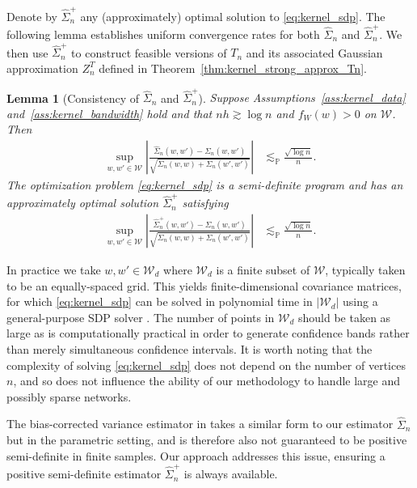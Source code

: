 \documentclass[11pt,lof]{puthesis}
\renewcommand{\P}{\ensuremath{\mathbb{P}}}
\newcommand{\cW}{\ensuremath{\mathcal{W}}}
\theoremstyle{break}
\newtheorem{lemma}{Lemma}[section]
\theoremstyle{proof}
\begin{document}
Denote by $\hat\Sigma_n^+$ any (approximately) optimal solution to
\eqref{eq:kernel_sdp}. The following lemma establishes uniform convergence rates
for both $\hat \Sigma_n$ and $\hat \Sigma_n^+$.
We then use $\hat \Sigma_n^+$ to construct feasible versions of $T_n$ and its
associated Gaussian approximation $Z_n^{T}$ defined in
Theorem~\ref{thm:kernel_strong_approx_Tn}.
%
\begin{lemma}[Consistency of $\hat \Sigma_n$ and $\hat \Sigma_n^+$]
  \label{lem:kernel_sdp}
  Suppose Assumptions~\ref{ass:kernel_data} and~\ref{ass:kernel_bandwidth} hold
  and that $n h \gtrsim \log n$ and $f_W(w) > 0$ on $\cW$. Then
  \begin{align*}
    \sup_{w,w' \in \cW}
    \left| \frac{\hat \Sigma_n(w,w') - \Sigma_n(w,w')}
    {\sqrt{\Sigma_n(w,w) + \Sigma_n(w',w')}} \right|
    &\lesssim_\P \frac{\sqrt{\log n}}{n}.
  \end{align*}
  The optimization problem \eqref{eq:kernel_sdp} is a semi-definite
  program
  \citep[SDP,][]{laurent2005semidefinite} and has an approximately optimal
  solution $\hat\Sigma_n^+$ satisfying
  \begin{align*}
    \sup_{w,w' \in \cW} \left|
    \frac{\hat \Sigma_n^+(w,w') - \Sigma_n(w,w')}
    {\sqrt{\Sigma_n(w,w) + \Sigma_n(w',w')}} \right|
    &\lesssim_\P \frac{\sqrt{\log n}}{n}.
  \end{align*}
\end{lemma}

In practice we take $w, w' \in \cW_d$ where $\cW_d$ is a finite subset of
$\cW$, typically taken to be an equally-spaced grid. This yields
finite-dimensional covariance matrices, for which \eqref{eq:kernel_sdp} can be
solved
in polynomial time in $|\cW_d|$ using a general-purpose SDP solver
\citep[e.g.\ by interior point methods,][]{laurent2005semidefinite}.
The number of points in $\cW_d$ should be taken as large as is computationally
practical in order to generate confidence bands rather than merely simultaneous
confidence intervals. It is worth noting that the complexity of solving
\eqref{eq:kernel_sdp} does not depend on the number of vertices $n$, and so
does not
influence the ability of our methodology to handle large and possibly sparse
networks.

The bias-corrected variance estimator in
\citet[Section~3.2]{matsushita2021jackknife} takes a similar form to our
estimator
$\hat\Sigma_n$ but in the parametric setting, and is therefore also not
guaranteed to be positive semi-definite in finite samples. Our approach
addresses this issue, ensuring a positive semi-definite estimator
$\hat\Sigma_n^+$ is always available.
\end{document}
